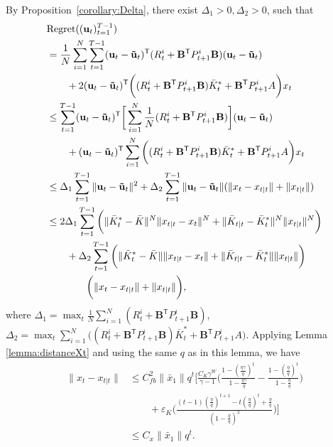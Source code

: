 \documentclass[letterpaper, 10 pt, conference]{ieeeconf}  %
\newcommand{\contTilde}[1]{\mathbf{\tilde{#1}}}
\newcommand{\transpose}{\mathsf{T}}
\begin{document}
By Proposition~\ref{corollary:Delta}, there exist $\Delta_{1}>0,\Delta_{2}>0$, such that
\begin{align}
    &\text{Regret}((\mathbf{u}_{t})_{t=1}^{T-1})\notag \\
    &= \frac{1}{N}\sum_{i=1}^{N}\sum_{t=1}^{T-1} (\mathbf{u}_{t}-\contTilde{u}_{t})^{\transpose}(R_{t}^{i}+\mathbf{B}^{\transpose}P_{t+1}^{i}\mathbf{B})(\mathbf{u}_{t}-\contTilde{u}_{t})\notag \\
    &\qquad + 2(\mathbf{u}_{t}-\contTilde{u}_{t})^{\transpose}\bigg((R_{t}^{i}+\mathbf{B}^{\transpose}P_{t+1}^{i}\mathbf{B})\bar{K}_{t}^{*}+\mathbf{B}^{\transpose}P_{t+1}^{i}A\bigg)x_{t}\notag \\
    &\leq \sum_{t=1}^{T-1} (\mathbf{u}_{t}-\contTilde{u}_{t})^{\transpose}\bigg[\sum_{i=1}^{N}\frac{1}{N}(R_{t}^{i}+\mathbf{B}^{\transpose}P_{t+1}^{i}\mathbf{B})\bigg](\mathbf{u}_{t}-\contTilde{u}_{t})\notag \\
    &\qquad + (\mathbf{u}_{t}-\contTilde{u}_{t})^{\transpose}\sum_{i=1}^{N}\bigg( (R_{t}^{i}+\mathbf{B}^{\transpose}P_{t+1}^{i}\mathbf{B})\bar{K}_{t}^{*}+\mathbf{B}^{\transpose}P_{t+1}^{i}A\bigg)x_{t} \notag\\
    &\leq \Delta_{1} \sum_{t=1}^{T-1} \|\mathbf{u}_{t}-\contTilde{u}_{t}\|^2 + \Delta_{2}\sum_{t=1}^{T-1} \|\mathbf{u}_{t}-\contTilde{u}_{t}\|(\|x_{t}-x_{t|t}\| + \|x_{t|t}\|)\notag \\
    &\leq 2\Delta_{1} \sum_{t=1}^{T-1} \bigg(\|\bar{K}_{t}^{*}-\bar{K}\|^{N}\|x_{t\mid t}-x_{t}\|^{N}  + \|\bar{K}_{t|t}-\bar{K}_{t}^{*}\|^{N} \|x_{t|t}\|^{N} \bigg) \notag\\
    &\qquad + \Delta_{2}\sum_{t=1}^{T-1}\bigg( \|\bar{K}_{t}^{*}-\bar{K}\|\|x_{t\mid t}-x_{t}\|  + \|\bar{K}_{t|t}-\bar{K}_{t}^{*}\| \|x_{t|t}\|\bigg)\notag \\
    &\qquad\qquad\bigg(\|x_{t}-x_{t|t}\| + \|x_{t|t}\|\bigg), \label{eq:RegredUnsimplified}
\end{align}
where $\Delta_{1} = \max_{t} \frac{1}{N}\sum_{i=1}^{N}(R_{t}^{i}+\mathbf{B}^{\transpose}P_{t+1}^{i}\mathbf{B})$,
    $\Delta_{2} = \max_{t} \sum_{i=1}^{N}\bigg( (R_{t}^{i}+\mathbf{B}^{\transpose}P_{t+1}^{i}\mathbf{B})\bar{K}_{t}^{*}+\mathbf{B}^{\transpose}P_{t+1}^{i}A\bigg)$.
    Applying Lemma \ref{lemma:distanceXt} and using the same $q$ as in this lemma, we have
\begin{align*}
    \|x_{t}-x_{t|t}\|&\leq C_{fb}^{2}\|\bar{x}_{1}\|q^{t}[\frac{C_{K}\gamma^{W}}{\gamma-1}\bigg(\frac{1-(\frac{\eta\gamma}{q})^{t}}{1-\frac{\eta\gamma}{q}} - \frac{1-(\frac{\eta}{q})^{t}}{1-\frac{\eta}{q}} \bigg)\\
    &\qquad+\varepsilon_{K}\bigg(\frac{(t-1)(\frac{\eta}{q})^{t+1}-t(\frac{\eta}{q})^{t}+\frac{\eta}{q}}{(1-\frac{\eta}{q})^{2}}\bigg)]\\
    &\leq C_{x}\|\bar{x}_{1}\|q^{t}.
\end{align*}
\end{document}
